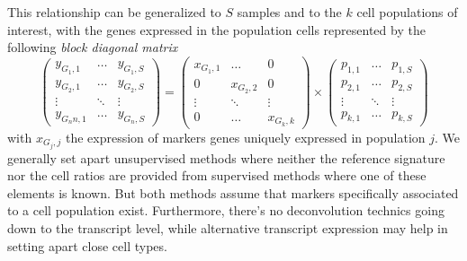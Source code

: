 This relationship can be generalized to \(S\) samples and to the \(k\)
cell populations of interest, with the genes expressed in the population
cells represented by the following \emph{block diagonal matrix} \[
\begin{pmatrix}
y_{G_1, 1} & \ldots & y_{G_1, S}\\
y_{G_2, 1} & \ldots & y_{G_2, S}\\
\vdots & \ddots & \vdots \\
y_{G_nn,1} & \ldots & y_{G_n, S}
\end{pmatrix}
=
\begin{pmatrix}
x_{G_1, 1}  &\ldots & 0\\
0 & x_{G_2, 2}   & 0\\
\vdots & \ddots & \vdots\\
0 & \ldots & x_{G_k, k}
\end{pmatrix}
\times
\begin{pmatrix}
p_{1, 1} & \ldots & p_{1, S}\\
p_{2, 1} & \ldots & p_{2, S}\\
\vdots & \ddots & \vdots \\
p_{k,1} & \ldots & p_{k, S}
\end{pmatrix}
\] with \(x_{G_j, j}\) the expression of markers genes uniquely
expressed in population \(j\). We generally set apart unsupervised
methods where neither the reference signature nor the cell ratios are
provided from supervised methods where one of these elements is known.
But both methods assume that markers specifically associated to a cell
population exist. Furthermore, there's no deconvolution technics going
down to the transcript level, while alternative transcript expression
may help in setting apart close cell types.


